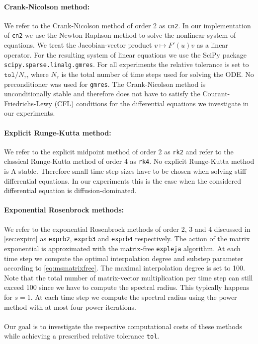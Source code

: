 \documentclass{scrartcl}
\begin{document}
	\paragraph{Crank-Nicolson method:}
	We refer to the Crank-Nicolson method of order 2 as \texttt{cn2}.
	In our implementation of \texttt{cn2} we use the Newton-Raphson method to solve the nonlinear system of equations. We treat the Jacobian-vector product $v\mapsto F'(u)v$ as a linear operator. For the resulting system of linear equations we use the SciPy package \texttt{scipy.sparse.linalg.gmres}. For all experiments the relative tolerance is set to $\texttt{tol}/N_\tau$, where $N_\tau$ is the total number of time steps used for solving the ODE. No preconditioner was used for \texttt{gmres}. The Crank-Nicolson method is unconditionally stable and therefore does not have to satisfy the Courant-Friedrichs-Lewy (CFL) conditions for the differential equations we investigate in our experiments.
	
	\paragraph{Explicit Runge-Kutta method:}
	We refer to the explicit midpoint method of order 2 as \texttt{rk2} and refer to the classical Runge-Kutta method of order 4 as \texttt{rk4}. No explicit Runge-Kutta method is A-stable. Therefore small time step sizes have to be chosen when solving stiff differential equations. In our experiments this is the case when the considered differential equation is diffusion-dominated.
	
	\paragraph{Exponential Rosenbrock methods:}
	We refer to the exponential Rosenbrock methods of order 2, 3 and 4 discussed in \ref{sec:expint} as \texttt{exprb2}, \texttt{exprb3} and \texttt{exprb4} respectively.
	The action of the matrix exponential is approximated with the matrix-free \texttt{expleja} algorithm. At each time step we compute the optimal interpolation degree and substep parameter according to \eqref{eq:msmatrixfree}. 
	The maximal interpolation degree is set to 100. Note that the total number of matrix-vector multiplication per time step can still exceed 100 since we have to compute the spectral radius. This typically happens for $s=1$. At each time step we compute the spectral radius using the power method with at most four power iterations.\\
	\\
	Our goal is to investigate the respective computational costs of these methods while achieving a prescribed relative tolerance \texttt{tol}.
	
\end{document}
